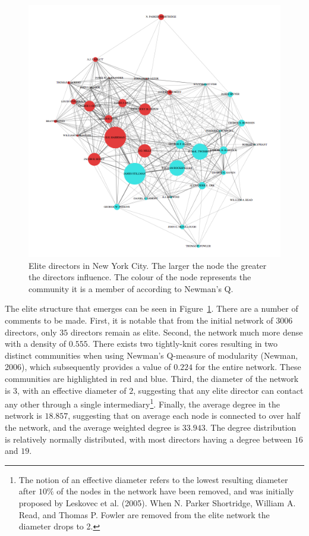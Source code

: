 \begin{figure}[t]
\begin{center}
\includegraphics[scale=0.38]{imgs/Elite.png}
\end{center}
\caption[Elite directors in New York City, 1902]{Elite directors in New York City. The larger the node the greater the directors influence. The colour of the node represents the community it is a member of according to Newman's Q.}
\label{Fig:elite}
\end{figure}

The elite structure that emerges can be seen in Figure~\ref{Fig:elite}. There are a number of comments to be made. First, it is notable that from the initial network of $3006$ directors, only $35$ directors remain as elite. Second, the network much more dense with a density of $0.555$. There exists two tightly-knit cores resulting in two distinct communities when using Newman's Q-measure of modularity (Newman, 2006), which subsequently provides a value of $0.224$ for the entire network. These communities are highlighted in red and blue. Third, the diameter of the network is $3$, with an effective diameter of $2$, suggesting that any elite director can contact any other through a single intermediary\footnote{The notion of an effective diameter refers to the lowest resulting diameter after $10\%$ of the nodes in the network have been removed, and was initially proposed by Leskovec et al. (2005). When N. Parker Shortridge, William A. Read, and Thomas P. Fowler are removed from the elite network the diameter drops to 2.}. Finally, the average degree in the network is $18.857$, suggesting that on average each node is connected to over half the network, and the average weighted degree is $33.943$. The degree distribution is relatively normally distributed, with most directors having a degree between $16$ and $19$.

